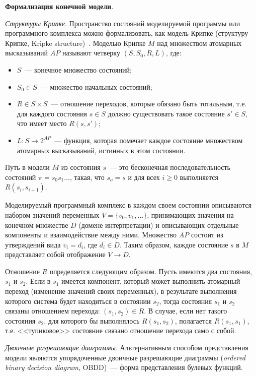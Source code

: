 \documentclass[a4paper,notitlepage,14pt]{article}
\begin{document}

\textbf{Формализация конечной модели}.

\textit{Структуры Крипке}. Пространство состояний моделируемой программы или программного
комплекса можно формализовать, как модель Крипке (структуру Крипке, Kripke
structure)~\cite{Clarke}. Моделью Крипке $M$ над множеством атомарных высказываний $AP$
называют четверку $(S, S_0, R, L)$, где:

\begin{itemize}
\item $S$~--- конечное множество состояний;
\item $S_0 \in S$~--- множество начальных состояний;
\item $R \in S \times S$~--- отношение переходов, которые обязано быть тотальным, т.е. для
  каждого состояния $s \in S$ должно существовать такое состояние $s' \in S$, что имеет
  место $R(s, s')$;
\item $L\colon S \rightarrow 2^{AP}$~--- функция, которая помечает каждое состояние
  множеством атомарных высказываний, истинных в этом состоянии.
\end{itemize}

Путь в модели $M$ из состояния $s$~--- это бесконечная последовательность состояний $\pi =
s_0 s_1 \ldots$, такая, что $s_o = s$ и для всех $i \geq 0$ выполняется $R(s_i, s_{i+1})$.

Моделируемый программный комплекс в каждом своем состоянии описываются набором значений
переменных $V = \{v_0, v_1, \ldots\}$, принимающих значения на конечном множестве $D$
(домене интерпретации) и описывающих отдельные компоненты и взаимодействие между
ними. Множество $AP$ состоит из утверждений вида $v_i = d_i$, где $d_i \in D$. Таким
образом, каждое состояние $s$ в $M$ представляет собой отображение $V \rightarrow D$.

Отношение $R$ определяется следующим образом. Пусть имеются два состояния, $s_1$ и
$s_2$. Если в $s_1$ имеется компонент, который может выполнить атомарный переход
(изменение значений своих переменных), в результате выполнения которого система будет
находиться в состоянии $s_2$, тогда состояния $s_1$ и $s_2$ связаны отношением перехода:
$(s_1, s_2) \in R$. В случае, если нет такого состояния $s_2$, для которого бы выполнялось
$R(s_1, s_2)$, полагается $R(s_1, s_1)$, т.е. <<тупиковое>> состояние связано отношение
перехода само с собой.

\textit{Двоичные разрешающие диаграммы}. Альтернативным способом представления модели
являются упорядоченные двоичные разрешающие диаграммы (\emph{ordered binary decision
  diagram}, OBDD)\cite{Clarke}~--- форма представления булевых функций.
\end{document}

